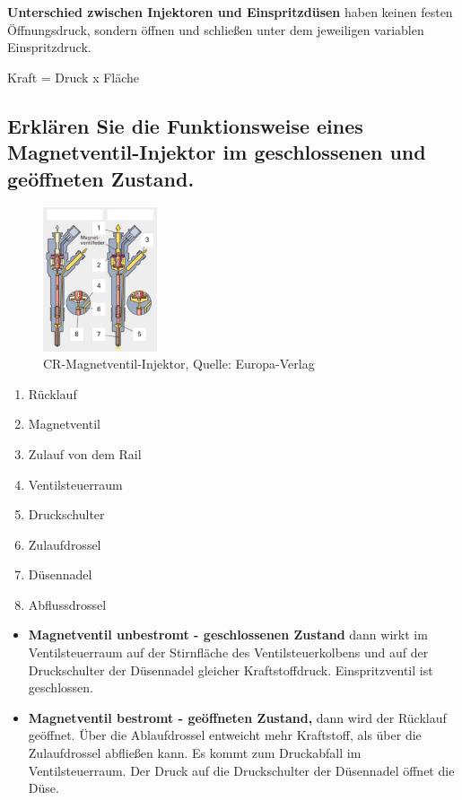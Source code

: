 \textbf{Unterschied zwischen Injektoren und Einspritzdüsen} haben keinen
festen Öffnungsdruck, sondern öffnen und schließen unter dem jeweiligen
variablen Einspritzdruck.

Kraft = Druck x Fläche

\subsection{Erklären Sie die Funktionsweise eines Magnetventil-Injektor
im geschlossenen und geöffneten
Zustand.}\label{erklaeren-sie-die-funktionsweise-eines-magnetventil-injektor-im-geschlossenen-und-geoeffneten-zustand.}

\begin{figure}[!ht]%
\centering
\includegraphics[width=0.3\textwidth]{images/Diesel/Diesel-7.pdf}
\caption{CR-Magnetventil-Injektor, Quelle: Europa-Verlag}
\end{figure}

\begin{enumerate}
\item
  Rücklauf
\item
  Magnetventil
\item
  Zulauf von dem Rail
\item
  Ventilsteuerraum
\item
  Druckschulter
\item
  Zulaufdrossel
\item
  Düsennadel
\item
  Abflussdrossel
\end{enumerate}

\begin{itemize}
\item
  \textbf{Magnetventil unbestromt - geschlossenen Zustand} dann wirkt im
  Ventilsteuerraum auf der Stirnfläche des Ventilsteuerkolbens und auf
  der Druckschulter der Düsennadel gleicher Kraftstoffdruck.
  Einspritzventil ist geschlossen.
\item
  \textbf{Magnetventil bestromt - geöffneten Zustand,} dann wird der
  Rücklauf geöffnet. Über die Ablaufdrossel entweicht mehr Kraftstoff,
  als über die Zulaufdrossel abfließen kann. Es kommt zum Druckabfall im
  Ventilsteuerraum. Der Druck auf die Druckschulter der Düsennadel
  öffnet die Düse.
\end{itemize}

